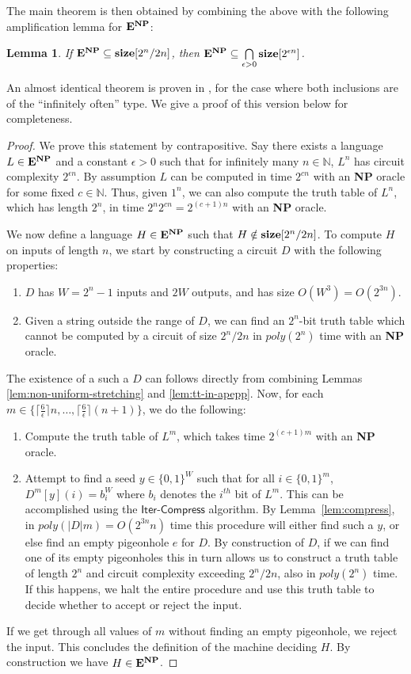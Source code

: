 \documentclass[11pt]{article}
\newtheorem{lemma}{Lemma}
\newcommand{\dash}{\text{-}}
\newcommand{\B}{\{0,1\}}
\def\cl{\bf}
\begin{document}
The main theorem is then obtained by combining the above with the following amplification lemma for ${\cl E}^{\cl NP}$:
\begin{lemma}
If ${\cl E}^{\cl NP} \subseteq {\cl size}[2^n/2n]$, then ${\cl E}^{\cl NP} \subseteq \bigcap\limits_{\epsilon>0}{\cl size}[2^{\epsilon n}]$.
\end{lemma}
An almost identical theorem is proven in \cite{Korten}, for the case where both inclusions are of the ``infinitely often'' type. We give a proof of this version below for completeness.
\begin{proof}
We prove this statement by contrapositive. Say there exists a language $L \in {\cl E}^{\cl NP}$ and a constant $\epsilon > 0$ such that for infinitely many $n \in \mathbb{N}$, $L^n$ has circuit complexity $2^{\epsilon n}$. By assumption $L$ can be computed in time $2^{cn}$ with an {\cl NP} oracle for some fixed $c \in \mathbb{N}$. Thus, given $1^n$, we can also compute the truth table of $L^n$, which has length $2^n$, in time $2^n2^{cn} = 2^{(c+1)n}$ with an {\cl NP} oracle. 

We now define a language $H \in {\cl E}^{\cl NP}$ such that $H \notin {\cl size}[2^n/2n]$. To compute $H$ on inputs of length $n$, we start by constructing a circuit $D$ with the following properties:
\begin{enumerate}
    \item $D$ has $W = 2^n - 1$ inputs and $2W$ outputs, and has size $O(W^3) = O(2^{3n})$.
    \item Given a string outside the range of $D$, we can find an $2^n$-bit truth table which cannot be computed by a circuit of size $2^n/2n$ in $poly(2^n)$ time with an {\cl NP} oracle.
\end{enumerate}
The existence of a such a $D$ can follows directly from combining Lemmas \ref{lem:non-uniform-stretching} and \ref{lem:tt-in-apepp}. Now, for each $m \in \{\lceil \frac{6}{\epsilon} \rceil n, \ldots, \lceil \frac{6}{\epsilon} \rceil (n+1)\}$, we do the following:
\begin{enumerate}
    \item Compute the truth table of $L^m$, which takes time $2^{(c+1)m}$ with an {\cl NP} oracle.
    \item Attempt to find a seed $y \in \B^W$ such that for all $i \in \{0,1\}^m$, $D^m[y](i) = b_i^W$ where $b_i$ denotes the $i^{th}$ bit of $L^m$. This can be accomplished using the $\mathsf{Iter\dash Compress}$ algorithm. By Lemma~\ref{lem:compress}, in $poly(|D|m) = O(2^{3n}n)$ time this procedure will either find such a $y$, or else find an empty pigeonhole $e$ for $D$. By construction of $D$, if we can find one of its empty pigeonholes this in turn allows us to construct a truth table of length $2^n$ and circuit complexity exceeding $2^n/2n$, also in $poly(2^n)$ time. If this happens, we halt the entire procedure and use this truth table to decide whether to accept or reject the input.
\end{enumerate}
If we get through all values of $m$ without finding an empty pigeonhole, we reject the input. This concludes the definition of the machine deciding $H$. By construction we have $H \in {\cl E}^{\cl NP}$.


\end{proof}
\end{document}
